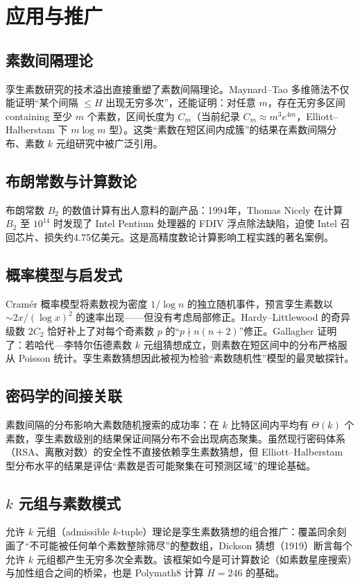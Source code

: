 \section{应用与推广}\label{sec:applications}

\subsection{素数间隔理论}

孪生素数研究的技术溢出直接重塑了素数间隔理论。Maynard--Tao 多维筛法不仅能证明“某个间隔 $\le H$ 出现无穷多次”，还能证明：对任意 $m$，存在无穷多区间 containing 至少 $m$ 个素数，区间长度为 $C_m$（当前纪录 $C_m \approx m^3 e^{4m}$，Elliott--Halberstam 下 $m \log m$ 型）。这类“素数在短区间内成簇”的结果在素数间隔分布、素数 $k$ 元组研究中被广泛引用。

\subsection{布朗常数与计算数论}

布朗常数 $B_2$ 的数值计算有出人意料的副产品：1994年，Thomas Nicely 在计算 $B_2$ 至 $10^{14}$ 时发现了 Intel Pentium 处理器的 FDIV 浮点除法缺陷，迫使 Intel 召回芯片、损失约4.75亿美元\cite{nicely1995enumeration}。这是高精度数论计算影响工程实践的著名案例。

\subsection{概率模型与启发式}

Cram\'er 概率模型\cite{cramer1936primes}将素数视为密度 $1/\log n$ 的独立随机事件，预言孪生素数以 $\sim 2x/(\log x)^2$ 的速率出现——但没有考虑局部修正。Hardy--Littlewood 的奇异级数 $2C_2$ 恰好补上了对每个奇素数 $p$ 的“$p \nmid n(n+2)$”修正。Gallagher 证明了：若哈代—李特尔伍德素数 $k$ 元组猜想成立，则素数在短区间中的分布严格服从 Poisson 统计。孪生素数猜想因此被视为检验“素数随机性”模型的最灵敏探针。

\subsection{密码学的间接关联}

素数间隔的分布影响大素数随机搜索的成功率：在 $k$ 比特区间内平均有 $\Theta(k)$ 个素数，孪生素数级别的结果保证间隔分布不会出现病态聚集。虽然现行密码体系（RSA、离散对数）的安全性不直接依赖孪生素数猜想，但 Elliott--Halberstam 型分布水平的结果是评估“素数是否可能聚集在可预测区域”的理论基础。

\subsection{$k$ 元组与素数模式}

允许 $k$ 元组（admissible $k$-tuple）理论是孪生素数猜想的组合推广：覆盖同余刻画了“不可能被任何单个素数整除筛尽”的整数组，Dickson 猜想（1919）断言每个允许 $k$ 元组都产生无穷多次全素数。该框架如今是可计算数论（如素数星座搜索）与加性组合之间的桥梁，也是 Polymath8 计算 $H = 246$ 的基础\cite{polymath2014variants}。
